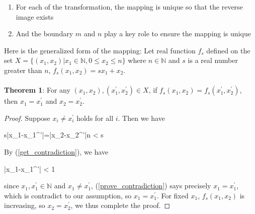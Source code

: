 \documentclass[10pt]{article}
\begin{document}
		\begin{enumerate}[label=(\Roman*)]
			\item For each of the transformation, the mapping is unique so that the reverse image exists
			\item And the boundary $m$ and $n$ play a key role to ensure the mapping is unique
		\end{enumerate}
		Here is the generalized form of the mapping: Let real function $f_s$ defined on the set $X=\{(x_1, x_2)|x_1\in \mathbb{N}, 0\leq x_2\leq n\}$ where $n\in \mathbb{N}$ and $s$ is a real number greater than $n$, $f_s(x_1, x_2) = sx_1+x_2$. \\\\
		\textbf{Theorem 1}: For any $(x_1, x_2), (x_1^{'}, x_2^{'})\in X$, if $f_s(x_1, x_2)=f_s(x_1^{'}, x_2^{'})$, then $x_1=x_1^{'}$ and $x_2=x_2^{'}$.
		\begin{proof}
			Suppose $x_i \neq x_i^{'}$ holds for all $i$. Then we have 
			\begin{flalign}
				s|x_1-x_1^{'}|=|x_2-x_2^{'}|\leq n < s \label{get_contradiction}
			\end{flalign}
			By (\ref{get_contradiction}), we have
			\begin{flalign}
				|x_1-x_1^{'}| < 1 \label{prove_contradiction}
			\end{flalign}
			since $x_1, x_1^{'}\in \mathbb{N}$ and $x_1\neq x_1^{'}$, (\ref{prove_contradiction}) says precisely $x_1=x_1^{'}$, which is contradict to our assumption, so $x_1=x_1^{'}$. For fixed $x_1$, $f_s(x_1, x_2)$ is increasing, so $x_2=x_2^{'}$, we thus complete the proof. 
		\end{proof}
	
\end{document}
